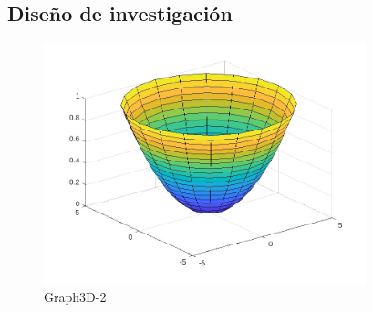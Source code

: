 \documentclass[12pt,a4paper]{article} %
\begin{document}
		\subsection{Diseño de investigación}
			\lipsum[1]
			\begin{figure}[ht]
				\centering
				\includegraphics[height=7cm]{Graph3D_2.pdf}
				\caption{Graph3D-2}
				\label{fig: Graph3D-2}
			\end{figure}
\end{document}
